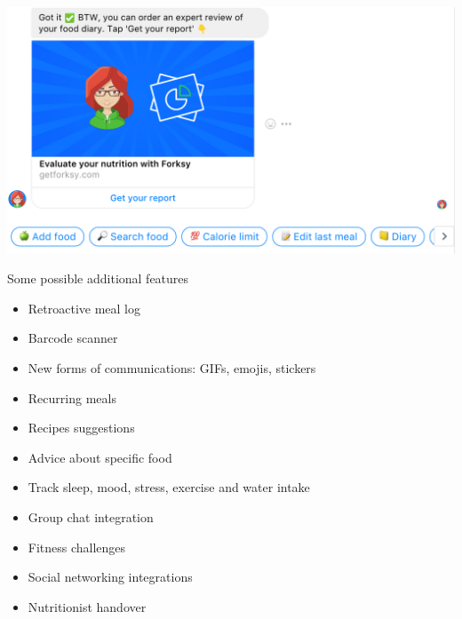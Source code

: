 \documentclass[landscape]{infslides}
\begin{document}
\begin{slide}{}
    \includegraphics[height=0.95\textheight]{Forksy_menu.png}
\end{slide}
\begin{slide}{Some possible additional features}
    \begin{itemize}\shrinklist
        \item Retroactive meal log
        \item Barcode scanner
        \item New forms of communications: GIFs, emojis, stickers
        \item Recurring meals
        \item Recipes suggestions
        \item Advice about specific food
        \item Track sleep, mood, stress, exercise and water intake
        \item Group chat integration
        \item Fitness challenges
        \item Social networking integrations
        \item Nutritionist handover
    \end{itemize}
\end{slide}
\end{document}
